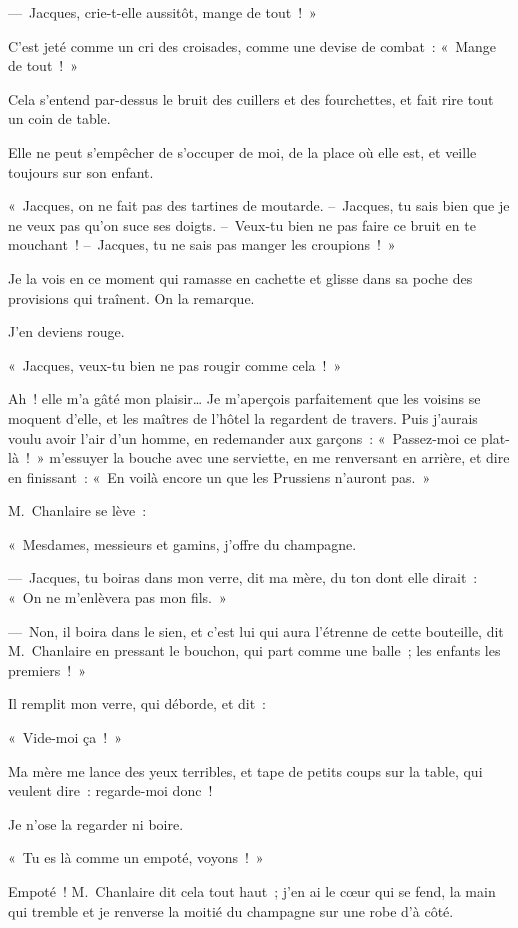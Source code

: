 \documentclass[french,twoside]{book} %
\begin{document}
— Jacques, crie-t-elle aussitôt, mange de tout ! »\par
C’est jeté comme un cri des croisades, comme une devise de combat : « Mange de tout ! »\par
Cela s’entend par-dessus le bruit des cuillers et des fourchettes, et fait rire tout un coin de table.\par
Elle ne peut s’empêcher de s’occuper de moi, de la place où elle est, et veille toujours sur son enfant.\par
« Jacques, on ne fait pas des tartines de moutarde. – Jacques, tu sais bien que je ne veux pas qu’on suce ses doigts. – Veux-tu bien ne pas faire ce bruit en te mouchant ! – Jacques, tu ne sais pas manger les croupions ! »\par
Je la vois en ce moment qui ramasse en cachette et glisse dans sa poche des provisions qui traînent. On la remarque.\par
J’en deviens rouge.\par
« Jacques, veux-tu bien ne pas rougir comme cela ! »\par
Ah ! elle m’a gâté mon plaisir… Je m’aperçois parfaitement que les voisins se moquent d’elle, et les maîtres de l’hôtel la regardent de travers. Puis j’aurais voulu avoir l’air d’un homme, en redemander aux garçons : « Passez-moi ce plat-là ! » m’essuyer la bouche avec une serviette, en me renversant en arrière, et dire en finissant : « En voilà encore un que les Prussiens n’auront pas. »\par
\bigbreak
\noindent M. Chanlaire se lève :\par
« Mesdames, messieurs et gamins, j’offre du champagne.\par
— Jacques, tu boiras dans mon verre, dit ma mère, du ton dont elle dirait : « On ne m’enlèvera pas mon fils. »\par
— Non, il boira dans le sien, et c’est lui qui aura l’étrenne de cette bouteille, dit M. Chanlaire en pressant le bouchon, qui part comme une balle ; les enfants les premiers ! »\par
Il remplit mon verre, qui déborde, et dit :\par
« Vide-moi ça ! »\par
Ma mère me lance des yeux terribles, et tape de petits coups sur la table, qui veulent dire : regarde-moi donc !\par
Je n’ose la regarder ni boire.\par
« Tu es là comme un empoté, voyons ! »\par
Empoté ! M. Chanlaire dit cela tout haut ; j’en ai le cœur qui se fend, la main qui tremble et je renverse la moitié du champagne sur une robe d’à côté.\par
\end{document}

